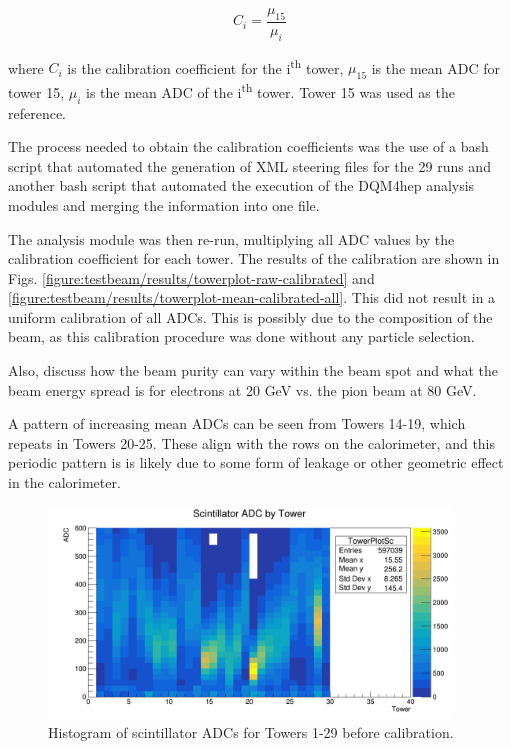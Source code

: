
\begin{equation}
	C_i = \frac{\mu_{15}}{\mu_i}
\label{eq:calibration-coeff}
\end{equation}

where $C_i$ is the calibration coefficient for the i\textsuperscript{th} tower, $\mu_{15}$ is the mean \acrshort{ADC} for tower 15, $\mu_i$ is the mean \acrshort{ADC} of the i\textsuperscript{th} tower. Tower 15 was used as the reference.

The process needed to obtain the calibration coefficients was the use of a bash script that automated the generation of \acrshort{XML} steering files for the 29 runs and another bash script that automated the execution of the \acrshort{DQM4hep} analysis modules and merging the information into one file.

The analysis module was then re-run, multiplying all \acrshort{ADC} values by the calibration coefficient for each tower. The results of the calibration are shown in Figs. \ref{figure:testbeam/results/towerplot-raw-calibrated} and \ref{figure:testbeam/results/towerplot-mean-calibrated-all}. This did not result in a uniform calibration of all \acrshort{ADC}s. This is possibly due to the composition of the beam, as this calibration procedure was done without any particle selection.


Also, discuss how the beam purity can vary within the beam spot and what the beam energy spread is for electrons at 20 GeV vs. the pion beam at 80 GeV. 

A pattern of increasing mean \acrshort{ADC}s can be seen from Towers 14-19, which repeats in Towers 20-25. These align with the rows on the calorimeter, and this periodic pattern is is likely due to some form of leakage or other geometric effect in the calorimeter. 

\begin{figure}[hp]
	\centering
	\includegraphics[width=0.95\textwidth]{../Pictures/IDEA/Calibration/new-towerplot-density-uncalibrated.png}
	\caption{Histogram of scintillator \acrshort{ADC}s for Towers 1-29 before calibration.}
	\label{figure:testbeam/results/towerplot-raw-uncalibrated}
\end{figure}

